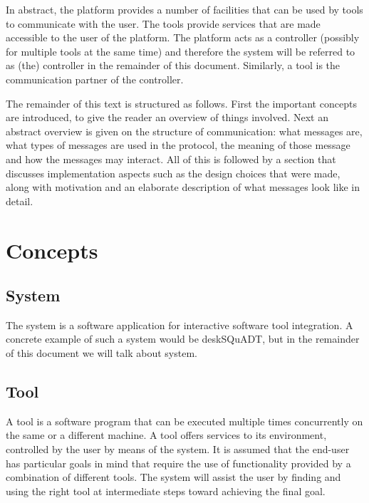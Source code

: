 \documentclass{article}
\begin{document}
  In abstract, the platform provides a number of facilities that can be used by
  tools to communicate with the user. The tools provide services that are made
  accessible to the user of the platform. The platform acts as a controller
  (possibly for multiple tools at the same time) and therefore the system will
  be referred to as (the) controller in the remainder of this document.
  Similarly, a tool is the communication partner of the controller.

  The remainder of this text is structured as follows. First the important
  concepts are introduced, to give the reader an overview of things involved.
  Next an abstract overview is given on the structure of communication: what
  messages are, what types of messages are used in the protocol, the meaning of
  those message and how the messages may interact. All of this is followed by a
  section that discusses implementation aspects such as the design choices that
  were made, along with motivation and an elaborate description of what
  messages look like in detail.

 \section{Concepts}

  \subsection{System}

   The system is a software application for interactive software tool
   integration. A concrete example of such a system would be deskSQuADT, but in
   the remainder of this document we will talk about system.

   
   
  \subsection{Tool}

   A tool is a software program that can be executed multiple times
   concurrently on the same or a different machine.  A tool offers services to
   its environment, controlled by the user by means of the system. It is
   assumed that the end-user has particular goals in mind that require the use
   of functionality provided by a combination of different tools. The system
   will assist the user by finding and using the right tool at intermediate
   steps toward achieving the final goal.
\end{document}
